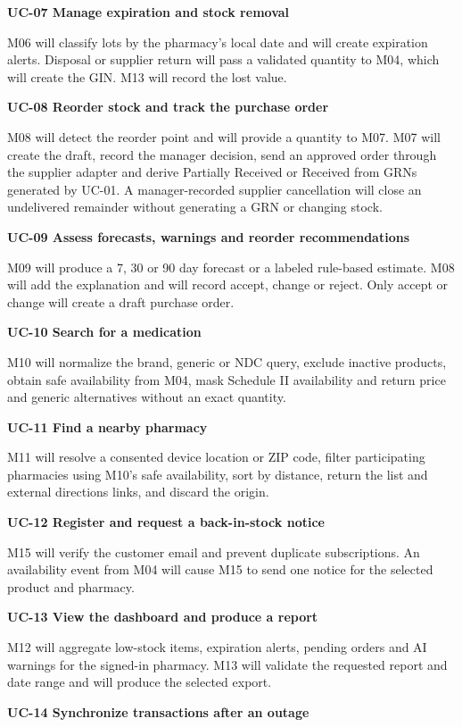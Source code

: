 \textbf{UC-07 Manage expiration and stock removal}

M06 will classify lots by the pharmacy's local date and will create expiration alerts. Disposal or supplier return will pass a validated quantity to M04, which will create the GIN. M13 will record the lost value.

\textbf{UC-08 Reorder stock and track the purchase order}

M08 will detect the reorder point and will provide a quantity to M07. M07 will create the draft, record the manager decision, send an approved order through the supplier adapter and derive Partially Received or Received from GRNs generated by UC-01. A manager-recorded supplier cancellation will close an undelivered remainder without generating a GRN or changing stock.

\textbf{UC-09 Assess forecasts, warnings and reorder recommendations}

M09 will produce a 7, 30 or 90 day forecast or a labeled rule-based estimate. M08 will add the explanation and will record accept, change or reject. Only accept or change will create a draft purchase order.

\textbf{UC-10 Search for a medication}

M10 will normalize the brand, generic or NDC query, exclude inactive products, obtain safe availability from M04, mask Schedule II availability and return price and generic alternatives without an exact quantity.

\textbf{UC-11 Find a nearby pharmacy}

M11 will resolve a consented device location or ZIP code, filter participating pharmacies using M10's safe availability, sort by distance, return the list and external directions links, and discard the origin.

\textbf{UC-12 Register and request a back-in-stock notice}

M15 will verify the customer email and prevent duplicate subscriptions. An availability event from M04 will cause M15 to send one notice for the selected product and pharmacy.

\textbf{UC-13 View the dashboard and produce a report}

M12 will aggregate low-stock items, expiration alerts, pending orders and AI warnings for the signed-in pharmacy. M13 will validate the requested report and date range and will produce the selected export.

\textbf{UC-14 Synchronize transactions after an outage}

